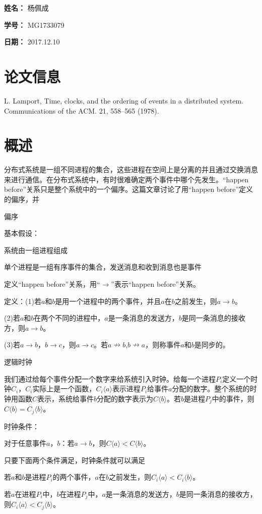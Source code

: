 \documentclass[UTF8]{article}
\begin{document}
    
{\flushleft \bf \Large 姓名：} 杨佩成

{\flushleft \bf \Large 学号：} MG1733079

{\flushleft \bf \Large 日期：} 2017.12.10


\section*{论文信息}
    
L. Lamport, Time, clocks, and the ordering of events in a distributed system. Communications of the ACM. 21, 558–565 (1978).


\section{概述}

	分布式系统是一组不同进程的集合，这些进程在空间上是分离的并且通过交换消息来进行通信。在分布式系统中，有时很难确定两个事件中哪个先发生。“happen before”关系只是整个系统中的一个偏序。这篇文章讨论了用“happen before”定义的偏序，并
    
	偏序

	基本假设：
	
	系统由一组进程组成
	
	单个进程是一组有序事件的集合，发送消息和收到消息也是事件

	定义“happen before”关系，用“$\to$”表示“happen before”关系。

	定义：(1)若$a$和$b$是用一个进程中的两个事件，并且$a$在$b$之前发生，则$a \to b$。

		(2)若$a$和$b$在两个不同的进程中，$a$是一条消息的发送方，$b$是同一条消息的接收方，则$a \to b$。

		(3)若$a \to b$，$b \to c$，则$a \to c$。若$a \nrightarrow b$,$b \nrightarrow a$，则称事件$a$和$b$是同步的。

	逻辑时钟
	
	我们通过给每个事件分配一个数字来给系统引入时钟。给每一个进程$P_i$定义一个时钟$C_i$，$C_i$实际上是一个函数，$C_i \langle a \rangle$表示进程$P_i$给事件$a$分配的数字。整个系统的时钟用函数$C$表示，系统给事件$b$分配的数字表示为$C \langle b \rangle$。若$b$是进程$P_j$中的事件，则$C\langle b\rangle =C_j\langle b\rangle$。
	
	时钟条件：
	
	对于任意事件$a$，$b$：若$a \to b$，则$C \langle a \rangle < C \langle b \rangle$。
	
	只要下面两个条件满足，时钟条件就可以满足
	
	若$a$和$b$是进程$P_i$的两个事件，$a$在$b$之前发生，则$C_i \langle a \rangle < C_i \langle b \rangle$。

	若$a$在进程$P_i$中，$b$在进程$P_j$中，$a$是一条消息的发送方，$b$是同一条消息的接收方，则$C_i \langle a \rangle < C_j \langle b \rangle$。
\end{document}
